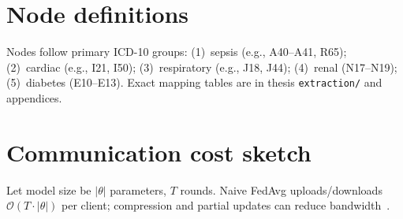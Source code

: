 \section{Node definitions}
\label{app:nodes}
Nodes follow primary ICD-10 groups: (1)~sepsis (e.g., A40--A41, R65); (2)~cardiac (e.g., I21, I50); (3)~respiratory (e.g., J18, J44); (4)~renal (N17--N19); (5)~diabetes (E10--E13). Exact mapping tables are in thesis \texttt{extraction/} and appendices.

\section{Communication cost sketch}
Let model size be $|\theta|$ parameters, $T$ rounds. Naive FedAvg uploads/downloads $\mathcal{O}(T \cdot |\theta|)$ per client; compression and partial updates can reduce bandwidth~\citep{kairouz2021advances}.

